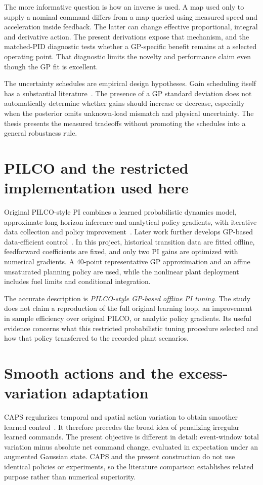 The more informative question is how an inverse is used. A map used only to supply a nominal command differs from a map queried using measured speed and acceleration inside feedback. The latter can change effective proportional, integral and derivative action. The present derivations expose that mechanism, and the matched-PID diagnostic tests whether a GP-specific benefit remains at a selected operating point. That diagnostic limits the novelty and performance claim even though the GP fit is excellent.

The uncertainty schedules are empirical design hypotheses. Gain scheduling itself has a substantial literature~\cite{scheduling}. The presence of a GP standard deviation does not automatically determine whether gains should increase or decrease, especially when the posterior omits unknown-load mismatch and physical uncertainty. The thesis presents the measured tradeoffs without promoting the schedules into a general robustness rule.

\section{PILCO and the restricted implementation used here}
Original PILCO-style PI combines a learned probabilistic dynamics model, approximate long-horizon inference and analytical policy gradients, with iterative data collection and policy improvement~\cite{pilco}. Later work further develops GP-based data-efficient control~\cite{deisenroth}. In this project, historical transition data are fitted offline, feedforward coefficients are fixed, and only two PI gains are optimized with numerical gradients. A 40-point representative GP approximation and an affine unsaturated planning policy are used, while the nonlinear plant deployment includes fuel limits and conditional integration.

The accurate description is \emph{PILCO-style GP-based offline PI tuning}. The study does not claim a reproduction of the full original learning loop, an improvement in sample efficiency over original PILCO, or analytic policy gradients. Its useful evidence concerns what this restricted probabilistic tuning procedure selected and how that policy transferred to the recorded plant scenarios.

\section{Smooth actions and the excess-variation adaptation}
CAPS regularizes temporal and spatial action variation to obtain smoother learned control~\cite{caps}. It therefore precedes the broad idea of penalizing irregular learned commands. The present objective is different in detail: event-window total variation minus absolute net command change, evaluated in expectation under an augmented Gaussian state. CAPS and the present construction do not use identical policies or experiments, so the literature comparison establishes related purpose rather than numerical superiority.


